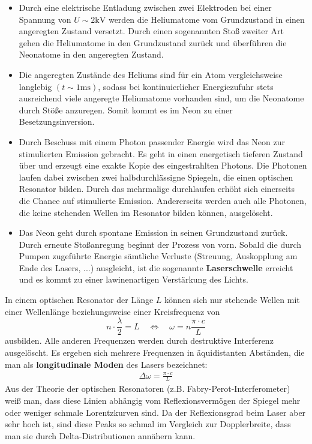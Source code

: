 \documentclass[german,  %
parskip=full,  %
]{scrartcl}
\begin{document}
\begin{itemize}
\item Durch eine elektrische Entladung zwischen zwei Elektroden bei einer Spannung von \(U\sim 2\mathrm{kV}\) werden die Heliumatome vom Grundzustand in einen angeregten Zustand versetzt. Durch einen sogenannten Stoß zweiter Art gehen die Heliumatome in den Grundzustand zurück und überführen die Neonatome in den angeregten Zustand.
\item Die angeregten Zustände des Heliums sind für ein Atom vergleichsweise langlebig \((t\sim 1\mathrm{ms})\), sodass bei kontinuierlicher Energiezufuhr stets ausreichend viele angeregte Heliumatome vorhanden sind, um die Neonatome durch Stöße anzuregen. Somit kommt es im Neon zu einer Besetzungsinversion.
\item Durch Beschuss mit einem Photon passender Energie wird das Neon zur stimulierten Emission gebracht. Es geht in einen energetisch tieferen Zustand über und erzeugt eine exakte Kopie des eingestrahlten Photons. Die Photonen laufen dabei zwischen zwei halbdurchlässigne Spiegeln, die einen optischen Resonator bilden. Durch das mehrmalige durchlaufen erhöht sich einerseits die Chance auf stimulierte Emission. Andererseits werden auch alle Photonen, die keine stehenden Wellen im Resonator bilden können, ausgelöscht.
\item Das Neon geht durch spontane Emission in seinen Grundzustand zurück. Durch erneute Stoßanregung beginnt der Prozess von vorn. Sobald die durch Pumpen zugeführte Energie sämtliche Verluste (Streuung, Auskopplung am Ende des Lasers, ...) ausgleicht, ist die sogenannte \textbf{Laserschwelle} erreicht und es kommt zu einer lawinenartigen Verstärkung des Lichts.
\end{itemize}
In einem optischen Resonator der Länge \(L\) können sich nur stehende Wellen mit einer Wellenlänge beziehungsweise einer Kreisfrequenz von
\[n\cdot\frac{\lambda}{2} = L  \quad\Longleftrightarrow\quad \omega = n\frac{\pi\cdot c}{L}\]
ausbilden. Alle anderen Frequenzen werden durch destruktive Interferenz ausgelöscht. Es ergeben sich mehrere Frequenzen in äquidistanten Abständen, die man als \textbf{longitudinale Moden} des Lasers bezeichnet:
\begin{align}
\Delta\omega = \frac{\pi\cdot c}{L}
\end{align}
Aus der Theorie der optischen Resonatoren (z.B. Fabry-Perot-Interferometer) weiß man, dass diese Linien abhängig vom Reflexionsvermögen der Spiegel mehr oder weniger schmale Lorentzkurven sind. Da der Reflexionsgrad beim Laser aber sehr hoch ist, sind diese Peaks so schmal im Vergleich zur Dopplerbreite, dass man sie durch Delta-Distributionen annähern kann. \\\\
\end{document}
